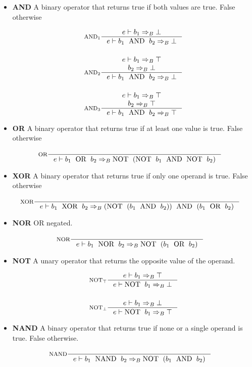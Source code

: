 \begin{itemize}
\item \textbf{AND} A binary operator that returns true if both values are true. False otherwise

\begin{align*}
&\inference[$\text{AND}_1$]{e \vdash b_1 \Rightarrow_B \bot}
                    {e \vdash b_1 \Tand b_2 \Rightarrow_B \bot}
\\\\
&\inference[$\text{AND}_2$]{e \vdash b_1 \Rightarrow_B \top \\ b_2 \Rightarrow_B \bot}
                    {e \vdash b_1 \Tand b_2 \Rightarrow_B \bot}
\\\\
&\inference[$\text{AND}_3$]{e \vdash b_1 \Rightarrow_B \top \\ b_2 \Rightarrow_B \top}
                    {e \vdash b_1 \Tand b_2 \Rightarrow_B \top}
\end{align*}


\item \textbf{OR} A binary operator that returns true if at least one value is true. False otherwise

\begin{align*}
&\inference[OR]{}
                 {e \vdash b_1 \Tor b_2 \Rightarrow_B \Tnot(\Tnot b_1 \Tand \Tnot b_2)}
\end{align*}

\item \textbf{XOR} A binary operator that returns true if only one operand is true. False otherwise

\begin{align*}
&\inference[XOR]{}
                  {e \vdash b_1 \Txor b_2 \Rightarrow_B (\Tnot(b_1 \Tand b_2)) \Tand (b_1 \Tor b_2)}
\end{align*}

\item \textbf{NOR} OR negated.

\begin{align*}
&\inference[NOR]{}
                   {e \vdash b_1 \Tnor b_2 \Rightarrow_B \Tnot( b_1 \Tor b_2 )}
\end{align*}

\item \textbf{NOT} A unary operator that returns the opposite value of the operand.

\begin{align*}
&\inference[$\text{NOT}_\top$]{e \vdash b_1 \Rightarrow_B \top}
                       {e \vdash \Tnot b_1 \Rightarrow_B \bot}
\\\\
&\inference[$\text{NOT}_\bot$]{e \vdash b_1 \Rightarrow_B \bot}
                       {e \vdash \Tnot b_1 \Rightarrow_B \top}
\end{align*}

\item \textbf{NAND} A binary operator that returns true if none or a single operand is true. False otherwise.

\begin{align*}
&\inference[NAND]{}
                   {e \vdash b_1 \Tnand b_2 \Rightarrow_B \Tnot( b_1 \Tand b_2 )}
\end{align*}

\end{itemize}